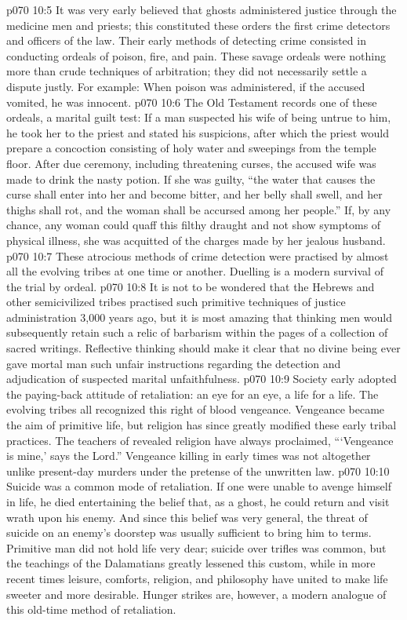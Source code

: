 \vs p070 10:5 It was very early believed that ghosts administered justice through the medicine men and priests; this constituted these orders the first crime detectors and officers of the law. Their early methods of detecting crime consisted in conducting ordeals of poison, fire, and pain. These savage ordeals were nothing more than crude techniques of arbitration; they did not necessarily settle a dispute justly. For example: When poison was administered, if the accused vomited, he was innocent.
\vs p070 10:6 The Old Testament records one of these ordeals, a marital guilt test: If a man suspected his wife of being untrue to him, he took her to the priest and stated his suspicions, after which the priest would prepare a concoction consisting of holy water and sweepings from the temple floor. After due ceremony, including threatening curses, the accused wife was made to drink the nasty potion. If she was guilty, “the water that causes the curse shall enter into her and become bitter, and her belly shall swell, and her thighs shall rot, and the woman shall be accursed among her people.” If, by any chance, any woman could quaff this filthy draught and not show symptoms of physical illness, she was acquitted of the charges made by her jealous husband.
\vs p070 10:7 These atrocious methods of crime detection were practised by almost all the evolving tribes at one time or another. Duelling is a modern survival of the trial by ordeal.
\vs p070 10:8 It is not to be wondered that the Hebrews and other semicivilized tribes practised such primitive techniques of justice administration 3,000 years ago, but it is most amazing that thinking men would subsequently retain such a relic of barbarism within the pages of a collection of sacred writings. Reflective thinking should make it clear that no divine being ever gave mortal man such unfair instructions regarding the detection and adjudication of suspected marital unfaithfulness.
\vs p070 10:9 \pc Society early adopted the paying\hyp{}back attitude of retaliation: an eye for an eye, a life for a life. The evolving tribes all recognized this right of blood vengeance. Vengeance became the aim of primitive life, but religion has since greatly modified these early tribal practices. The teachers of revealed religion have always proclaimed, “‘Vengeance is mine,’ says the Lord.” Vengeance killing in early times was not altogether unlike present\hyp{}day murders under the pretense of the unwritten law.
\vs p070 10:10 Suicide was a common mode of retaliation. If one were unable to avenge himself in life, he died entertaining the belief that, as a ghost, he could return and visit wrath upon his enemy. And since this belief was very general, the threat of suicide on an enemy’s doorstep was usually sufficient to bring him to terms. Primitive man did not hold life very dear; suicide over trifles was common, but the teachings of the Dalamatians greatly lessened this custom, while in more recent times leisure, comforts, religion, and philosophy have united to make life sweeter and more desirable. Hunger strikes are, however, a modern analogue of this old\hyp{}time method of retaliation.
